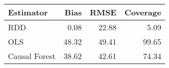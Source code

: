 \begin{table}[ht]
\centering
\begin{tabular}{lrrr}
  \hline
Estimator & Bias & RMSE & Coverage \\ 
  \hline
RDD & 0.08 & 22.88 & 5.09 \\ 
  OLS & 48.32 & 49.41 & 99.65 \\ 
  Causal Forest & 38.62 & 42.61 & 74.34 \\ 
   \hline
\end{tabular}
\end{table}
